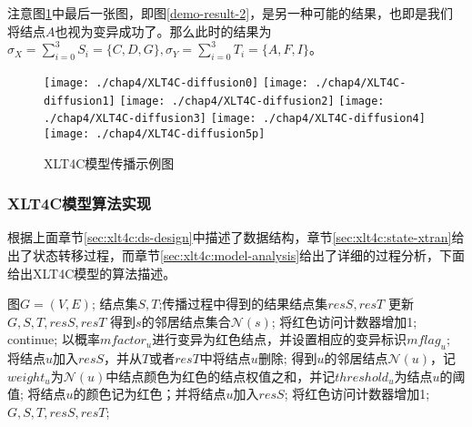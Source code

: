 注意图\ref{fig:chap4:xcic-demo}中最后一张图，即图\ref{demo-result-2}，是另一种可能的结果，也即是我们将结点$A$也视为变异成功了。那么此时的结果为$\sigma_{X}=\sum_{i=0}^{3}S_{i}=\{C, D, G\}, \sigma_{Y}=\sum_{i=0}^{3}T_{i}=\{A, F, I\}$。

\begin{figure}[H]
	\centering%
	{\texttt{[image: ./chap4/XLT4C-diffusion0]}}
	\hspace{3em}%
	{\texttt{[image: ./chap4/XLT4C-diffusion1]}}
	\hspace{3em}%
	{\texttt{[image: ./chap4/XLT4C-diffusion2]}}
	\hspace{3em}%
	{\texttt{[image: ./chap4/XLT4C-diffusion3]}}
	\hspace{3em}%
	{\texttt{[image: ./chap4/XLT4C-diffusion4]}}
	\hspace{3em}%
	{\texttt{[image: ./chap4/XLT4C-diffusion5p]}}
	\caption{XLT4C模型传播示例图}
	\label{fig:chap4:xcic-demo}
\end{figure}


\subsubsection{XLT4C模型算法实现}
根据上面章节\ref{sec:xlt4c:ds-design}中描述了数据结构，章节\ref{sec:xlt4c:state-xtran}给出了状态转移过程，而章节\ref{sec:xlt4c:model-analysis}给出了详细的过程分析，下面给出XLT4C模型的算法描述。


\begin{algorithm}[H]
	\caption{$XLT4C-RED-Update(G, S, T, resS, resT)$}
	\label{alg:chap4:inf-spread-red}
	\begin{algorithmic}[1]
	\REQUIRE 图$G=(V,E)$; 结点集$S,T$;传播过程中得到的结果结点集$resS, resT$
	\ENSURE 更新$G, S, T, resS, resT$
			\STATE 得到$s$的邻居结点集合$\mathcal{N}(s)$;
					\STATE 将红色访问计数器增加1;
					\STATE continue;
					\STATE 以概率$mfactor_{u}$进行变异为红色结点，并设置相应的变异标识$mflag_{u}$;
					\STATE 将结点$u$加入$resS$，并从$T$或者$resT$中将结点$u$删除;
				\ELSE
					\STATE 得到$u$的邻居结点$\mathcal{N}(u)$，记$weight_{u}$为$\mathcal{N}(u)$中结点颜色为红色的结点权值之和，并记$threshold_{u}$为结点$u$的阈值;
						\STATE 将结点$u$的颜色记为红色；并将结点$u$加入$resS$;
					\ENDIF
				\ENDIF
				\STATE 将红色访问计数器增加1;
			\ENDFOR
		\ENDFOR
		\RETURN $G, S, T, resS, resT$;
	\end{algorithmic}
\end{algorithm}


